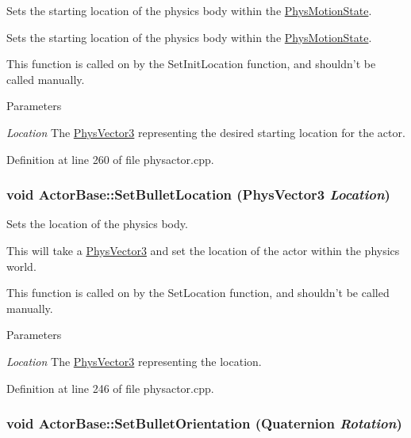 Sets the starting location of the physics body within the \hyperlink{classPhysMotionState}{PhysMotionState}. 

Sets the starting location of the physics body within the \hyperlink{classPhysMotionState}{PhysMotionState}. \par
 This function is called on by the SetInitLocation function, and shouldn't be called manually. 
\begin{DoxyParams}{Parameters}
\item[{\em Location}]The \hyperlink{classPhysVector3}{PhysVector3} representing the desired starting location for the actor. \end{DoxyParams}


Definition at line 260 of file physactor.cpp.

\hypertarget{classActorBase_af64a57138bbd32c52581a5c8d0d29a76}{
\subsubsection[{SetBulletLocation}]{\setlength{\rightskip}{0pt plus 5cm}void ActorBase::SetBulletLocation ({\bf PhysVector3} {\em Location})}}
\label{dd/d7b/classActorBase_af64a57138bbd32c52581a5c8d0d29a76}


Sets the location of the physics body. 

This will take a \hyperlink{classPhysVector3}{PhysVector3} and set the location of the actor within the physics world. \par
 This function is called on by the SetLocation function, and shouldn't be called manually. 
\begin{DoxyParams}{Parameters}
\item[{\em Location}]The \hyperlink{classPhysVector3}{PhysVector3} representing the location. \end{DoxyParams}


Definition at line 246 of file physactor.cpp.

\hypertarget{classActorBase_a1d9a2b13dcff7a6a2dc83f08f1db97ce}{
\subsubsection[{SetBulletOrientation}]{\setlength{\rightskip}{0pt plus 5cm}void ActorBase::SetBulletOrientation ({\bf Quaternion} {\em Rotation})}}
\label{dd/d7b/classActorBase_a1d9a2b13dcff7a6a2dc83f08f1db97ce}


